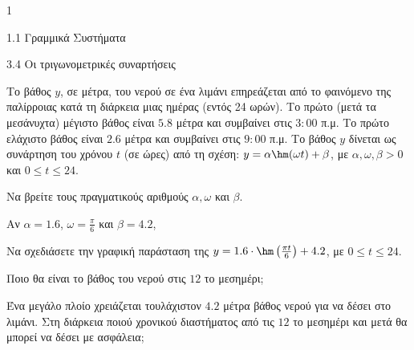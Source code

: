 \begin{ylh}{1}
\item 1.1 Γραμμικά Συστήματα
\item 3.4 Οι τριγωνομετρικές συναρτήσεις
\end{ylh}
Το βάθος $y$, σε μέτρα, του νερού σε ένα λιμάνι επηρεάζεται από το φαινόμενο της παλίρροιας κατά τη διάρκεια μιας ημέρας (εντός 24 ωρών). Το πρώτο (μετά τα μεσάνυχτα) μέγιστο βάθος είναι $5.8$ μέτρα και συμβαίνει στις $3:00$ π.μ. Το πρώτο ελάχιστο βάθος είναι $2.6$ μέτρα και συμβαίνει στις $9:00$ π.μ. Το βάθος $y$ δίνεται ως συνάρτηση του χρόνου $t$ (σε ώρες) από τη σχέση: $y = \alpha\hm (\omega t) + \beta$, με $\alpha, \omega, \beta > 0$ και $0 \le t \le 24$.
\begin{alist}
\item Να βρείτε τους πραγματικούς αριθμούς $\alpha, \omega$ και $\beta$.
\item Αν $\alpha = 1.6$, $\omega = \frac{\pi}{6}$ και $\beta = 4.2$,
\begin{rlist}
\item Να σχεδιάσετε την γραφική παράσταση της $y = 1.6\cdot\hm \left(\frac{\pi t}{6}\right) + 4.2$, με $0 \le t \le 24$.
\item Ποιο θα είναι το βάθος του νερού στις $12$ το μεσημέρι;
\item Ένα μεγάλο πλοίο χρειάζεται τουλάχιστον $4.2$ μέτρα βάθος νερού για να δέσει στο λιμάνι. Στη διάρκεια ποιού χρονικού διαστήματος από τις $12$ το μεσημέρι και μετά θα μπορεί να δέσει με ασφάλεια;
\end{rlist}
\end{alist}

